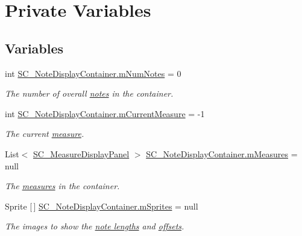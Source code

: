 \hypertarget{group___s_c___n_d_c_priv_var}{}\section{Private Variables}
\label{group___s_c___n_d_c_priv_var}
\subsection*{Variables}
\begin{DoxyCompactItemize}
\item 
int \hyperlink{group___s_c___n_d_c_priv_var_gae06a4919a63806ed57b2040f41b7ca1b}{S\+C\+\_\+\+Note\+Display\+Container.\+m\+Num\+Notes} = 0
\begin{DoxyCompactList}\small\item\em The number of overall \hyperlink{group___music_structs_struct_music_1_1_combined_note}{notes} in the container. \end{DoxyCompactList}\item 
int \hyperlink{group___s_c___n_d_c_priv_var_ga28ce2bf8358c9f686b5b9e362aa96dff}{S\+C\+\_\+\+Note\+Display\+Container.\+m\+Current\+Measure} = -\/1
\begin{DoxyCompactList}\small\item\em The current \hyperlink{group___doc_s_c___m_d_p}{measure}. \end{DoxyCompactList}\item 
List$<$ \hyperlink{class_s_c___measure_display_panel}{S\+C\+\_\+\+Measure\+Display\+Panel} $>$ \hyperlink{group___s_c___n_d_c_priv_var_gaa072fb53f6bd6646bc85f2ebc2a02229}{S\+C\+\_\+\+Note\+Display\+Container.\+m\+Measures} = null
\begin{DoxyCompactList}\small\item\em The \hyperlink{group___doc_s_c___m_d_p}{measures} in the container. \end{DoxyCompactList}\item 
Sprite \mbox{[}$\,$\mbox{]} \hyperlink{group___s_c___n_d_c_priv_var_gac8df613ee0996e999278da2b3f523e34}{S\+C\+\_\+\+Note\+Display\+Container.\+m\+Sprites} = null
\begin{DoxyCompactList}\small\item\em The images to show the \hyperlink{group___music_structs_ac35cd02f5b3c00e3040b51e40e9e6c94}{note lengths} and \hyperlink{group___music_structs_ae281187907aed4c728c7981300dbebaf}{offsets}. \end{DoxyCompactList}\end{DoxyCompactItemize}


